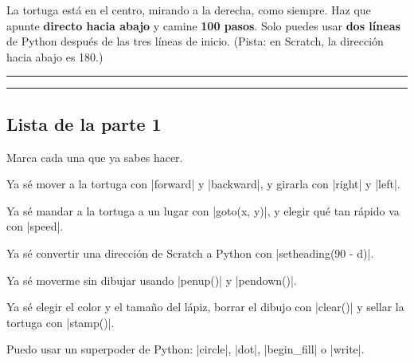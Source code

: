 \begin{puzzle}
La tortuga está en el centro, mirando a la derecha, como siempre. Haz que apunte \textbf{directo hacia abajo} y camine \textbf{100 pasos}. Solo puedes usar \textbf{dos líneas} de Python después de las tres líneas de inicio. (Pista: en Scratch, la dirección hacia abajo es 180.)

\vspace{6pt}
\rule{\linewidth}{0.4pt}\par\vspace{12pt}
\rule{\linewidth}{0.4pt}
\end{puzzle}

\subsection*{Lista de la parte 1}

Marca cada una que ya sabes hacer.

\tick Ya sé mover a la tortuga con \py|forward| y \py|backward|, y girarla con \py|right| y \py|left|.\par
\tick Ya sé mandar a la tortuga a un lugar con \py|goto(x, y)|, y elegir qué tan rápido va con \py|speed|.\par
\tick Ya sé convertir una dirección de Scratch a Python con \py|setheading(90 - d)|.\par
\tick Ya sé moverme sin dibujar usando \py|penup()| y \py|pendown()|.\par
\tick Ya sé elegir el color y el tamaño del lápiz, borrar el dibujo con \py|clear()| y sellar la tortuga con \py|stamp()|.\par
\tick Puedo usar un superpoder de Python: \py|circle|, \py|dot|, \py|begin_fill| o \py|write|.
